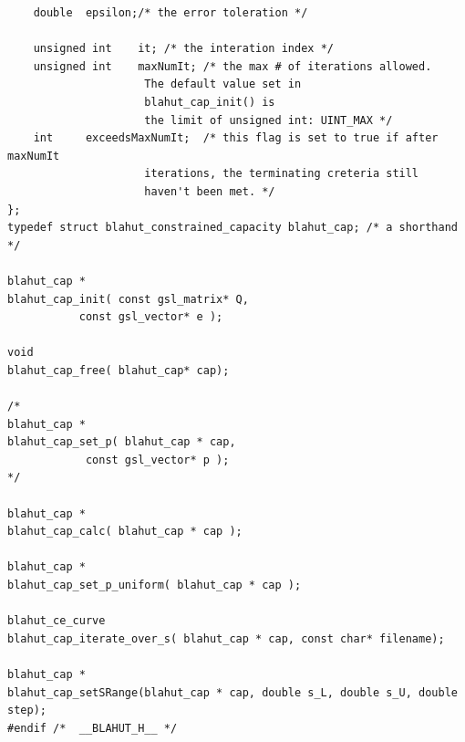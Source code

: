 \documentclass[a4paper,10pt]{article}
\begin{document}
\begin{verbatim}
    double 	epsilon;/* the error toleration */

    unsigned int	it;	/* the interation index */
    unsigned int	maxNumIt; /* the max # of iterations allowed.
				     The default value set in 
				     blahut_cap_init() is 
				     the limit of unsigned int: UINT_MAX */
    int		exceedsMaxNumIt;  /* this flag is set to true if after maxNumIt 
				     iterations, the terminating creteria still 
				     haven't been met. */
};
typedef struct blahut_constrained_capacity blahut_cap; /* a shorthand */

blahut_cap * 
blahut_cap_init( const gsl_matrix* Q, 
		   const gsl_vector* e );

void 
blahut_cap_free( blahut_cap* cap);

/*
blahut_cap * 
blahut_cap_set_p( blahut_cap * cap,
		    const gsl_vector* p );
*/

blahut_cap *
blahut_cap_calc( blahut_cap * cap );

blahut_cap * 
blahut_cap_set_p_uniform( blahut_cap * cap );

blahut_ce_curve 
blahut_cap_iterate_over_s( blahut_cap * cap, const char* filename);

blahut_cap * 
blahut_cap_setSRange(blahut_cap * cap, double s_L, double s_U, double step);
#endif /*  __BLAHUT_H__ */

\end{verbatim}
\end{document}
